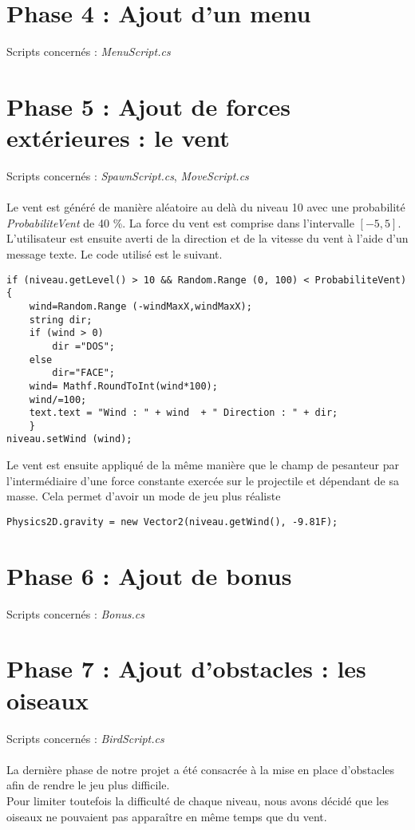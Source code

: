 \documentclass[12pt,a4paper]{report}
\begin{document}
\section{Phase 4 : Ajout d'un menu}
Scripts concernés : \textit{MenuScript.cs}
\section{Phase 5 : Ajout de forces extérieures : le vent}
Scripts concernés : \textit{SpawnScript.cs}, \textit{MoveScript.cs}\\
\\
Le vent est généré de manière aléatoire au delà du niveau 10 avec une probabilité \textit{ProbabiliteVent} de 40 \%. La force du vent est comprise dans l'intervalle \(\left[-5, 5\right]\). L'utilisateur est ensuite averti de la direction et de la vitesse du vent à l'aide d'un message texte. Le code utilisé est le suivant.
  \begin{lstlisting}
if (niveau.getLevel() > 10 && Random.Range (0, 100) < ProbabiliteVent) 
{
	wind=Random.Range (-windMaxX,windMaxX);
	string dir;
	if (wind > 0)
		dir ="DOS";
	else
		dir="FACE";
	wind= Mathf.RoundToInt(wind*100);
	wind/=100;
	text.text = "Wind : " + wind  + " Direction : " + dir;
	}
niveau.setWind (wind);
\end{lstlisting}
Le vent est ensuite appliqué de la même manière que le champ de pesanteur par l'intermédiaire d'une force constante exercée sur le projectile et dépendant de sa  masse. Cela permet d'avoir un mode de jeu plus réaliste
\begin{lstlisting}
Physics2D.gravity = new Vector2(niveau.getWind(), -9.81F);
\end{lstlisting}
\section{Phase 6 : Ajout de bonus}
Scripts concernés : \textit{Bonus.cs}
\section{Phase 7 : Ajout d'obstacles : les oiseaux}
Scripts concernés : \textit{BirdScript.cs}\\
\\
La dernière phase de notre projet a été consacrée à la mise en place d'obstacles afin de rendre le jeu plus difficile.\\
Pour limiter toutefois la difficulté de chaque niveau, nous avons décidé que les oiseaux ne pouvaient pas apparaître en même temps que du vent.
\end{document}
